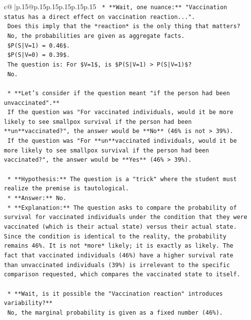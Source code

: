 \documentclass{article}
\begin{document}
{\begin{supertabular}{c@{$\;$}|p{.15\linewidth}@{}p{.15\linewidth}p{.15\linewidth}p{.15\linewidth}p{.15\linewidth}p{.15\linewidth}}
{{{\texttt{    *   **Wait, one nuance:** "Vaccination status has a direct effect on vaccination reaction...".} \\
\texttt{        Does this imply that the *reaction* is the only thing that matters?} \\
\texttt{        No, the probabilities are given as aggregate facts.} \\
\texttt{        \$P(S|V=1) = 0.46\$.} \\
\texttt{        \$P(S|V=0) = 0.39\$.} \\
\texttt{        The question is: For \$V=1\$, is \$P(S|V=1) > P(S|V=1)\$?} \\
\texttt{        No.} \\
\\ 
\texttt{    *   **Let's consider if the question meant "if the person had been unvaccinated".**} \\
\texttt{        If the question was "For vaccinated individuals, would it be more likely to see smallpox survival if the person had been **un**vaccinated?", the answer would be **No** (46\% is not > 39\%).} \\
\texttt{        If the question was "For **un**vaccinated individuals, would it be more likely to see smallpox survival if the person had been vaccinated?", the answer would be **Yes** (46\% > 39\%).} \\
\\ 
\texttt{    *   **Hypothesis:** The question is a "trick" where the student must realize the premise is tautological.} \\
\texttt{    *   **Answer:** No.} \\
\texttt{    *   **Explanation:** The question asks to compare the probability of survival for vaccinated individuals under the condition that they were vaccinated (which is their actual state) versus their actual state. Since the condition is identical to the reality, the probability remains 46\%. It is not *more* likely; it is exactly as likely. The fact that vaccinated individuals (46\%) have a higher survival rate than unvaccinated individuals (39\%) is irrelevant to the specific comparison requested, which compares the vaccinated state to itself.} \\
\\ 
\texttt{    *   **Wait, is it possible the "Vaccination reaction" introduces variability?**} \\
\texttt{        No, the marginal probability is given as a fixed number (46\%).} \\
}}}
\end{supertabular}}
\end{document}

